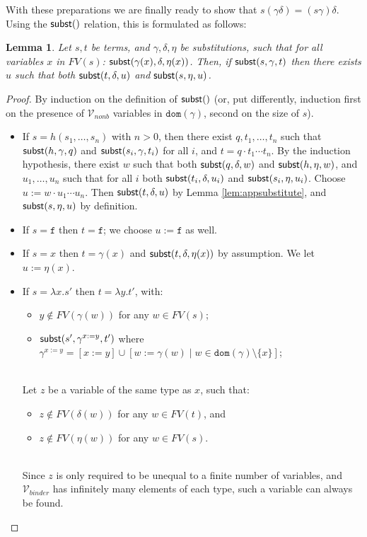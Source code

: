 \documentclass{lmcs}
\theoremstyle{theorem}\newtheorem{theorem}{Theorem}
\theoremstyle{theorem}\newtheorem{lemma}[theorem]{Lemma}
\theoremstyle{theorem}\newtheorem{corollary}[theorem]{Corollary}
\theoremstyle{definition}\newtheorem{definition}[theorem]{Definition}
\theoremstyle{definition}\newtheorem{example}[theorem]{Example}
\newcommand{\Vfree}{\mathcal{V}_{\mathit{nonb}}}
\newcommand{\Vbound}{\mathcal{V}_{\mathit{binder}}}
\newcommand{\FV}{\mathit{FV}}
\newcommand{\domain}{\mathtt{dom}}
\newcommand{\identifier}[1]{\mathtt{#1}}
\newcommand{\afun}{\identifier{f}}
\newcommand{\avar}{x}
\newcommand{\bvar}{y}
\newcommand{\cvar}{z}
\newcommand{\abs}[2]{\lambda #1.#2}
\begin{document}
With these preparations we are finally ready to show that $s(\gamma\delta) = (s\gamma)\delta$.
Using the $\mathsf{subst}()$ relation, this is formulated as follows:

\begin{lemma}\label{lem:combinesubsthelper}
Let $s,t$ be terms, and $\gamma,\delta,\eta$ be substitutions, such that for all variables $x$ in
$\FV(s)$: $\mathsf{subst}(\gamma(x),\delta,\eta(x))$.  Then,
  if $\mathsf{subst}(s,\gamma,t)$ then there exists $u$ such that both $\mathsf{subst}(t,\delta,u)$ and
  $\mathsf{subst}(s,\eta,u)$.
\end{lemma}

\begin{proof}
By induction on the definition of $\mathsf{subst}()$ (or, put differently, induction first on the presence
of $\Vfree$ variables in $\domain(\gamma)$, second on the size of $s$).

\begin{itemize}
\item If $s = h(s_1,\dots,s_n)$ with $n > 0$, then there exist $q, t_1,\dots,t_n$ such that
  $\mathsf{subst}(h,\gamma,q)$ and $\mathsf{subst}(s_i,\gamma,t_i)$ for all $i$, and $t = q \cdot t_1 \cdots
  t_n$.  By the induction hypothesis, there exist $w$ such that both
  $\mathsf{subst}(q,\delta,w)$ and $\mathsf{subst}(h,\eta,w)$, and $u_1,\dots,u_n$ such that for all $i$
  both $\mathsf{subst}(t_i,\delta,u_i)$ and $\mathsf{subst}(s_i,\eta,u_i)$.
  Choose $u := w \cdot u_1 \cdots u_n$.
  Then $\mathsf{subst}(t,\delta,u)$ by Lemma \ref{lem:appsubstitute}, and $\mathsf{subst}(s,\eta,u)$ by
  definition.
\item If $s = \afun$ then $t = \afun$; we choose $u := \afun$ as well.
\item If $s = \avar$ then $t = \gamma(\avar)$ and $\subrel{t,\delta,\eta(\avar)}$ by assumption.
  We let $u := \eta(\avar)$.
\item If $s = \abs{\avar}{s'}$ then $t = \abs{\bvar}{t'}$, with:
  \begin{itemize}
  \item $\bvar \notin \FV(\gamma(w))$ for any $w \in \FV(s)$;
  \item $\subrel{s',\gamma^{\avar:=\bvar},t'}$
    where $\gamma^{\avar:=\bvar} = [\avar:=\bvar] \cup [w:=\gamma(w) \mid w \in \domain(\gamma)
    \setminus \{\avar\}]$;
  \end{itemize}
  \ \\
  Let $\cvar$ be a variable of the same type as $\avar$, such that:
  \begin{itemize}
  \item $\cvar \notin \FV(\delta(w))$ for any $w \in \FV(t)$, and
  \item $\cvar \notin \FV(\eta(w))$ for any $w \in \FV(s)$.
  \end{itemize}
  \ \\
  Since $\cvar$ is only required to be unequal to a finite number of variables, and $\Vbound$ has
  infinitely many elements of each type, such a variable can always be found.


\end{itemize}
\end{proof}
\end{document}
